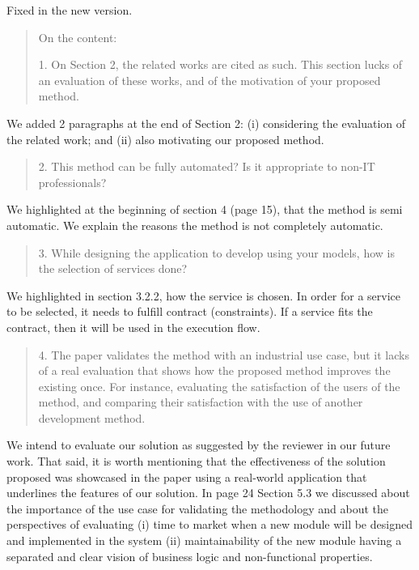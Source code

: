\documentclass[12pt,a4wide]{article}
\begin{document}
\noindent 
Fixed in the new version.


\begin{quotation}\sf\footnotesize

\noindent On the content: 

1.    On Section 2, the related works are cited as such. This section lucks of an evaluation of these works, and of the motivation of your proposed method. 
\end{quotation}

\noindent 
We added 2 paragraphs at the end of Section 2: (i) considering the evaluation of the related work; and (ii) also motivating our proposed method. 
\begin{quotation}\sf\footnotesize

2.    This method can be fully automated? Is it appropriate to non-IT professionals? 
\end{quotation}

\noindent 
We highlighted at the beginning of section 4 (page 15), that the method is semi automatic. We explain the reasons the method is not completely automatic.

\begin{quotation}\sf\footnotesize

3.    While designing the application to develop using your models, how is the selection of services done? 
\end{quotation}

\noindent 
We highlighted in section 3.2.2, how the service is chosen. In order for a service to be selected, it needs to fulfill contract (constraints). If a service fits the contract, then it will be used in the execution flow.

\begin{quotation}\sf\footnotesize

4.    The paper validates the method with an industrial use case, but it lacks of a real evaluation that shows how the proposed method improves the existing once. For instance, evaluating the satisfaction of the users of the method, and comparing their satisfaction with the use of another development method. 
\end{quotation}

\noindent 
We intend to evaluate our solution as suggested by the reviewer in our future work. That said, it is worth mentioning that the effectiveness of the solution proposed was showcased in the paper using a real-world application that underlines the features of our solution. In page 24 Section 5.3  we discussed about the importance of the use case for validating the methodology and about the perspectives of evaluating (i) time to market when a new module will be designed and implemented in the system (ii) maintainability of the new module having a separated and clear vision of business logic and non-functional properties.
\end{document}
